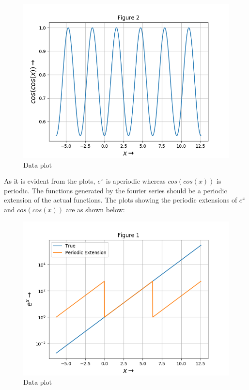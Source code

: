 \documentclass[11pt, a4paper]{article}
\begin{document}
   \begin{figure}[!tbh]
   	\centering
   	\includegraphics[scale=0.6]{Figure_2.png}   
   	\caption{Data plot}
   	\label{fig:sample}
   \end{figure} 
   As it is evident from the plots, $e^{x}$ is aperiodic whereas $cos(cos(x))$ is periodic. The functions generated by the fourier series should be a periodic extension of the actual functions. The plots showing the periodic extensions of $e^{x}$ and $cos(cos(x))$ are as shown below:
   \begin{figure}[!tbh]
   	\centering
   	\includegraphics[scale=0.6]{Figure_1p.png}   
   	\caption{Data plot}
   	\label{fig:sample}
   \end{figure} 
   
\end{document}

